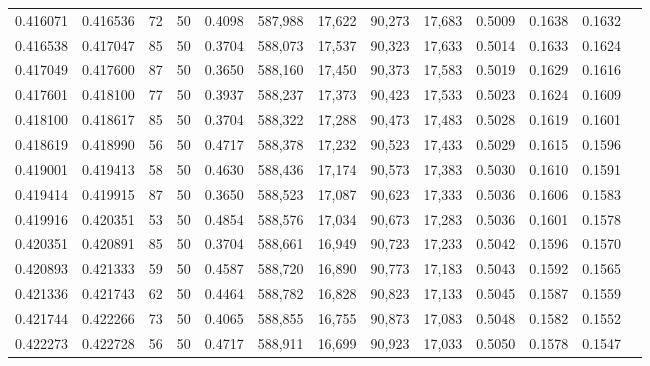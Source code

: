 \begin{tabular}{rrrrrrrrrrrrr}
0.416071 & 0.416536 &    72 &  50 &                                     0.4098 & 587,988 &  17,622 &  90,273 &  17,683 & 0.5009 & 0.1638 & 0.1632 \\
0.416538 & 0.417047 &    85 &  50 &                                     0.3704 & 588,073 &  17,537 &  90,323 &  17,633 & 0.5014 & 0.1633 & 0.1624 \\
0.417049 & 0.417600 &    87 &  50 &                                     0.3650 & 588,160 &  17,450 &  90,373 &  17,583 & 0.5019 & 0.1629 & 0.1616 \\
0.417601 & 0.418100 &    77 &  50 &                                     0.3937 & 588,237 &  17,373 &  90,423 &  17,533 & 0.5023 & 0.1624 & 0.1609 \\
0.418100 & 0.418617 &    85 &  50 &                                     0.3704 & 588,322 &  17,288 &  90,473 &  17,483 & 0.5028 & 0.1619 & 0.1601 \\
0.418619 & 0.418990 &    56 &  50 &                                     0.4717 & 588,378 &  17,232 &  90,523 &  17,433 & 0.5029 & 0.1615 & 0.1596 \\
0.419001 & 0.419413 &    58 &  50 &                                     0.4630 & 588,436 &  17,174 &  90,573 &  17,383 & 0.5030 & 0.1610 & 0.1591 \\
0.419414 & 0.419915 &    87 &  50 &                                     0.3650 & 588,523 &  17,087 &  90,623 &  17,333 & 0.5036 & 0.1606 & 0.1583 \\
0.419916 & 0.420351 &    53 &  50 &                                     0.4854 & 588,576 &  17,034 &  90,673 &  17,283 & 0.5036 & 0.1601 & 0.1578 \\
0.420351 & 0.420891 &    85 &  50 &                                     0.3704 & 588,661 &  16,949 &  90,723 &  17,233 & 0.5042 & 0.1596 & 0.1570 \\
0.420893 & 0.421333 &    59 &  50 &                                     0.4587 & 588,720 &  16,890 &  90,773 &  17,183 & 0.5043 & 0.1592 & 0.1565 \\
0.421336 & 0.421743 &    62 &  50 &                                     0.4464 & 588,782 &  16,828 &  90,823 &  17,133 & 0.5045 & 0.1587 & 0.1559 \\
0.421744 & 0.422266 &    73 &  50 &                                     0.4065 & 588,855 &  16,755 &  90,873 &  17,083 & 0.5048 & 0.1582 & 0.1552 \\
0.422273 & 0.422728 &    56 &  50 &                                     0.4717 & 588,911 &  16,699 &  90,923 &  17,033 & 0.5050 & 0.1578 & 0.1547 \\

\end{tabular}
